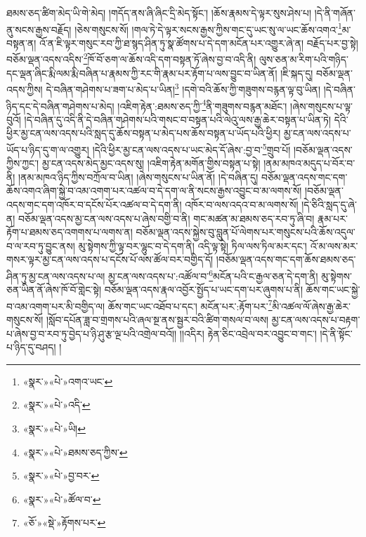 ཐམས་ཅད་ཚིག་མེད་ཡི་གེ་མེད། །གདོད་ནས་ཞི་ཞིང་དྲི་མེད་སྟོང་། །ཆོས་རྣམས་དེ་ལྟར་སུས་ཤེས་པ། །དེ་ནི་གཞོན་ནུ་སངས་རྒྱས་བརྗོད། །ཅེས་གསུངས་སོ། །གལ་ཏེ་དེ་ལྟར་སངས་རྒྱས་ཀྱིས་གང་དུ་ཡང་སུ་ལ་ཡང་ཆོས་འགའ་\footnote{«སྣར་»«པེ་»འགའ་ཡང་}མ་བསྟན་ན། འོ་ན་ཇི་ལྟར་གསུང་རབ་ཀྱི་ཐ་སྙད་ཤིན་ཏུ་སྣ་ཚོགས་པ་དེ་དག་མངོན་པར་འགྱུར་ཞེ་ན། བརྗོད་པར་བྱ་སྟེ། བཅོམ་ལྡན་འདས་འདིས་\footnote{«སྣར་»«པེ་»འདི་}ཁོ་བོ་ཅག་ལ་ཆོས་འདི་དག་བསྟན་ཏོ་ཞེས་བྱ་བ་འདི་ནི། ལུས་ཅན་མ་རིག་པའི་གཉིད་དང་ལྡན་ཞིང་རྨི་ལམ་རྨི་བཞིན་པ་རྣམས་ཀྱི་རང་གི་རྣམ་པར་རྟོག་པ་ལས་བྱུང་བ་ཡིན་ནོ། །ཇི་སྐད་དུ། བཅོམ་ལྡན་འདས་ཀྱིས། དེ་བཞིན་གཤེགས་པ་ཟག་པ་མེད་པ་ཡིན།\footnote{«སྣར་»«པེ་»ཡི།} །དགེ་བའི་ཆོས་ཀྱི་གཟུགས་བརྙན་ལྟ་བུ་ཡིན། །དེ་བཞིན་ཉིད་དང་དེ་བཞིན་གཤེགས་པ་མེད། །འཇིག་རྟེན་:ཐམས་ཅད་ཀྱི་\footnote{«སྣར་»«པེ་»ཐམས་ཅད་ཀྱིས་}ནི་གཟུགས་བརྙན་མཐོང་། །ཞེས་གསུངས་པ་ལྟ་བུའོ། །དེ་བཞིན་དུ་འདི་ནི་དེ་བཞིན་གཤེགས་པའི་གསང་བ་བསྟན་པའི་ལེའུ་ལས་རྒྱ་ཆེར་བསྟན་པ་ཡིན་ཏེ། དེའི་ཕྱིར་མྱ་ངན་ལས་འདས་པའི་སླད་དུ་ཆོས་བསྟན་པ་མེད་པས་ཆོས་བསྟན་པ་ཡོད་པའི་ཕྱིར། མྱ་ངན་ལས་འདས་པ་ཡོད་པ་ཉིད་དུ་ག་ལ་འགྱུར། །དེའི་ཕྱིར་མྱ་ངན་ལས་འདས་པ་ཡང་མེད་དོ་ཞེས་:བྱ་བ་\footnote{«སྣར་»«པེ་»བྱ་བར་}གྲུབ་པོ། །བཅོམ་ལྡན་འདས་ཀྱིས་ཀྱང་། མྱ་ངན་འདས་མེད་མྱང་འདས་སུ། །འཇིག་རྟེན་མགོན་གྱིས་བསྟན་པ་སྟེ། །ནམ་མཁའ་མདུད་པ་བོར་བ་ནི། །ནམ་མཁའ་ཉིད་ཀྱིས་བཀྲོལ་བ་ཡིན། །ཞེས་གསུངས་པ་ཡིན་ནོ། །དེ་བཞིན་དུ། བཅོམ་ལྡན་འདས་གང་དག་ཆོས་འགའ་ཞིག་སྐྱེ་བ་འམ་འགག་པར་འཚལ་བ་དེ་དག་ལ་ནི་སངས་རྒྱས་འབྱུང་བ་མ་ལགས་སོ། །བཅོམ་ལྡན་འདས་གང་དག་འཁོར་བ་དངོས་པོར་འཚལ་བ་དེ་དག་ནི། འཁོར་བ་ལས་འདའ་བ་མ་ལགས་སོ། །དེ་ཅིའི་སླད་དུ་ཞེ་ན། བཅོམ་ལྡན་འདས་མྱ་ངན་ལས་འདས་པ་ཞེས་བགྱི་བ་ནི། གང་མཚན་མ་ཐམས་ཅད་རབ་ཏུ་ཞི་བ། རྣམ་པར་རྟོག་པ་ཐམས་ཅད་འགགས་པ་ལགས་ན། བཅོམ་ལྡན་འདས་སྐྱེས་བུ་བླུན་པོ་ལེགས་པར་གསུངས་པའི་ཆོས་འདུལ་བ་ལ་རབ་ཏུ་བྱུང་ནས། མུ་སྟེགས་ཀྱི་ལྟ་བར་ལྷུང་བ་དེ་དག་ནི། འདི་ལྟ་སྟེ། ཏིལ་ལས་ཏིལ་མར་དང་། འོ་མ་ལས་མར་གསར་ལྟར་མྱ་ངན་ལས་འདས་པ་དངོས་པོ་ལས་ཚོལ་བར་བགྱིད་དོ། །བཅོམ་ལྡན་འདས་གང་དག་ཆོས་ཐམས་ཅད་ཤིན་ཏུ་མྱ་ངན་ལས་འདས་པ་ལ། མྱ་ངན་ལས་འདས་པ་:འཚོལ་བ་\footnote{«སྣར་»«པེ་»ཚོལ་བ་}མངོན་པའི་ང་རྒྱལ་ཅན་དེ་དག་ནི། མུ་སྟེགས་ཅན་ཡིན་ནོ་ཞེས་ཁོ་བོ་གླེང་སྟེ། བཅོམ་ལྡན་འདས་རྣལ་འབྱོར་སྤྱོད་པ་ཡང་དག་པར་ཞུགས་པ་ནི། ཆོས་གང་ཡང་སྐྱེ་བ་འམ་འགག་པར་མི་བགྱིད་ལ། ཆོས་གང་ཡང་འཐོབ་པ་དང་། མངོན་པར་:རྟོག་པར་\footnote{«ཅོ་»«སྡེ་»རྟོགས་པར་}མི་འཚལ་ལོ་ཞེས་རྒྱ་ཆེར་གསུངས་སོ། །སློབ་དཔོན་ཟླ་བ་གྲགས་པའི་ཞལ་སྔ་ནས་སྦྱར་བའི་ཚིག་གསལ་བ་ལས། མྱ་ངན་ལས་འདས་པ་བརྟག་པ་ཞེས་བྱ་བ་རབ་ཏུ་བྱེད་པ་ཉི་ཤུ་རྩ་ལྔ་པའི་འགྲེལ་བའོ།། །།འདིར། རྟེན་ཅིང་འབྲེལ་བར་འབྱུང་བ་གང་། །དེ་ནི་སྟོང་པ་ཉིད་དུ་བཤད། །
